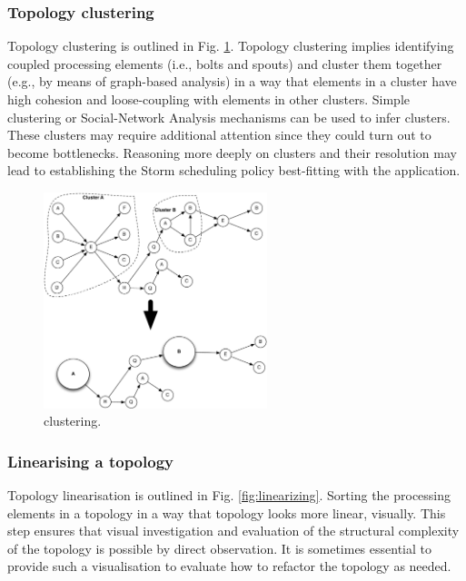 \subsubsection{Topology clustering}\label{3}
Topology clustering is outlined in Fig. \ref{fig:clustering}. Topology clustering implies identifying coupled processing elements (i.e., bolts and spouts) and cluster them together (e.g., by means of graph-based analysis) in a way that elements in a cluster have high cohesion and loose-coupling with elements in other clusters. Simple clustering or Social-Network Analysis mechanisms can be used to infer clusters. These clusters may require additional attention since they could turn out to become bottlenecks. Reasoning more deeply on clusters and their resolution may lead to establishing the Storm scheduling policy best-fitting with the application.

\begin{figure}
	\begin{center}
		\includegraphics[width=6.5cm]{images/clustering}
		\caption{clustering.}
		\label{fig:clustering}
	\end{center}
\end{figure}

\subsubsection{Linearising a topology}\label{4}

Topology linearisation is outlined in Fig. \ref{fig:linearizing}. Sorting the processing elements in a topology in a way that topology looks more linear, visually. This step ensures that visual investigation and evaluation of the structural complexity of the topology is possible by direct observation. It is sometimes essential to provide such a visualisation to evaluate how to refactor the topology as needed.

